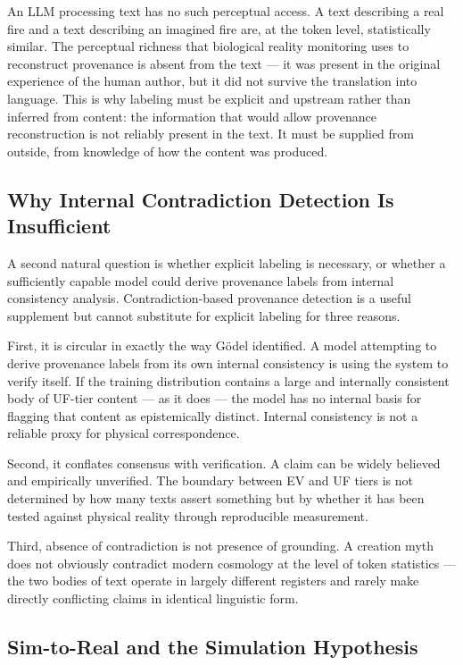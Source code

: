 \documentclass[12pt]{article}
\begin{document}
An LLM processing text has no such perceptual access. A text describing
a real fire and a text describing an imagined fire are, at the token
level, statistically similar. The perceptual richness that biological
reality monitoring uses to reconstruct provenance is absent from the
text --- it was present in the original experience of the human author,
but it did not survive the translation into language. This is why
labeling must be explicit and upstream rather than inferred from
content: the information that would allow provenance reconstruction is
not reliably present in the text. It must be supplied from outside, from
knowledge of how the content was produced.

\subsection{Why Internal Contradiction Detection Is Insufficient}\label{why-internal-contradiction-detection-is-insufficient}

A second natural question is whether explicit labeling is necessary, or
whether a sufficiently capable model could derive provenance labels from
internal consistency analysis. Contradiction-based provenance detection
is a useful supplement but cannot substitute for explicit labeling for
three reasons.

First, it is circular in exactly the way Gödel identified. A model
attempting to derive provenance labels from its own internal consistency
is using the system to verify itself. If the training distribution
contains a large and internally consistent body of UF-tier content ---
as it does --- the model has no internal basis for flagging that content
as epistemically distinct. Internal consistency is not a reliable proxy
for physical correspondence.

Second, it conflates consensus with verification. A claim can be widely
believed and empirically unverified. The boundary between EV and UF
tiers is not determined by how many texts assert something but by
whether it has been tested against physical reality through reproducible
measurement.

Third, absence of contradiction is not presence of grounding. A creation
myth does not obviously contradict modern cosmology at the level of
token statistics --- the two bodies of text operate in largely different
registers and rarely make directly conflicting claims in identical
linguistic form.

\subsection{Sim-to-Real and the Simulation Hypothesis}\label{sim-to-real-and-the-simulation-hypothesis}
\end{document}
